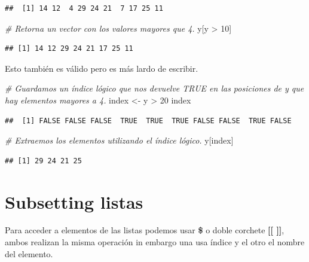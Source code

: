 \documentclass[
  12pt,
]{book}
\newenvironment{Shaded}{\begin{snugshade}}{\end{snugshade}}
\newcommand{\CommentTok}[1]{\textcolor[rgb]{0.56,0.35,0.01}{\textit{#1}}}
\newcommand{\DecValTok}[1]{\textcolor[rgb]{0.00,0.00,0.81}{#1}}
\newcommand{\NormalTok}[1]{#1}
\newcommand{\OtherTok}[1]{\textcolor[rgb]{0.56,0.35,0.01}{#1}}
\newcommand{\SpecialCharTok}[1]{\textcolor[rgb]{0.00,0.00,0.00}{#1}}
\begin{document}
\begin{verbatim}
##  [1] 14 12  4 29 24 21  7 17 25 11
\end{verbatim}

\begin{Shaded}
\begin{Highlighting}[]
\CommentTok{\# Retorna un vector con los valores mayores que 4.}
\NormalTok{y[y }\SpecialCharTok{\textgreater{}} \DecValTok{10}\NormalTok{]}
\end{Highlighting}
\end{Shaded}

\begin{verbatim}
## [1] 14 12 29 24 21 17 25 11
\end{verbatim}

Esto también es válido pero es más lardo de escribir.

\begin{Shaded}
\begin{Highlighting}[]
\CommentTok{\# Guardamos un índice lógico que nos devuelve TRUE en las posiciones de y que hay elementos mayores a 4.}
\NormalTok{index }\OtherTok{\textless{}{-}}\NormalTok{ y }\SpecialCharTok{\textgreater{}} \DecValTok{20}
\NormalTok{index}
\end{Highlighting}
\end{Shaded}

\begin{verbatim}
##  [1] FALSE FALSE FALSE  TRUE  TRUE  TRUE FALSE FALSE  TRUE FALSE
\end{verbatim}

\begin{Shaded}
\begin{Highlighting}[]
\CommentTok{\# Extraemos los elementos utilizando el índice lógico.}
\NormalTok{y[index]}
\end{Highlighting}
\end{Shaded}

\begin{verbatim}
## [1] 29 24 21 25
\end{verbatim}

\hypertarget{subsetting-listas}{%
\section{\texorpdfstring{\textbf{Subsetting listas}}{Subsetting listas}}\label{subsetting-listas}}

Para acceder a elementos de las listas podemos usar \textbf{\$} o doble corchete \textbf{{[}{[} {]}{]}}, ambos realizan la misma operación in embargo una usa índice y el otro el nombre del elemento.
\end{document}
